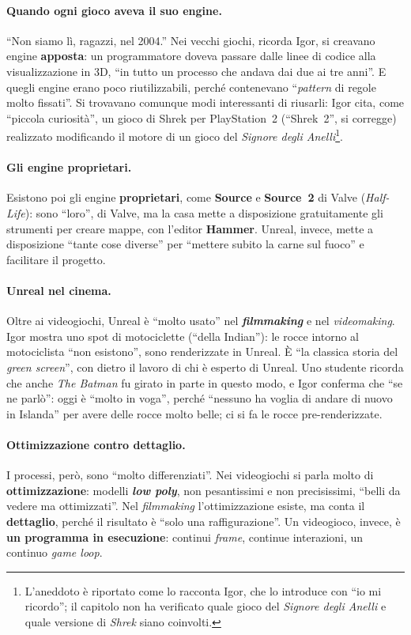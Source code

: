 \paragraph{Quando ogni gioco aveva il suo engine.} ``Non siamo lì, ragazzi, nel 2004.'' Nei
vecchi giochi, ricorda Igor, si creavano engine \textbf{apposta}: un programmatore
doveva passare dalle linee di codice alla visualizzazione in 3D, ``in tutto un processo
che andava dai due ai tre anni''. E quegli engine erano poco riutilizzabili, perché
contenevano ``\emph{pattern} di regole molto fissati''. Si trovavano comunque modi
interessanti di riusarli: Igor cita, come ``piccola curiosità'', un gioco di Shrek per
PlayStation~2 (``Shrek~2'', si corregge) realizzato modificando il motore di un gioco
del \emph{Signore degli Anelli}\footnote{L'aneddoto è riportato come lo racconta Igor,
che lo introduce con ``io mi ricordo''; il capitolo non ha verificato quale gioco del
\emph{Signore degli Anelli} e quale versione di \emph{Shrek} siano coinvolti.}.

\paragraph{Gli engine proprietari.} Esistono poi gli engine \textbf{proprietari}, come
\textbf{Source} e \textbf{Source~2} di Valve (\emph{Half-Life}): sono ``loro'', di Valve,
ma la casa mette a disposizione gratuitamente gli strumenti per creare mappe, con
l'editor \textbf{Hammer}. Unreal, invece, mette a disposizione ``tante cose diverse''
per ``mettere subito la carne sul fuoco'' e facilitare il progetto.

\paragraph{Unreal nel cinema.} Oltre ai videogiochi, Unreal è ``molto usato'' nel
\textbf{\emph{filmmaking}} e nel \emph{videomaking}. Igor mostra uno spot di
motociclette (``della Indian''): le rocce intorno al motociclista ``non esistono'', sono
renderizzate in Unreal. È ``la classica storia del \emph{green screen}'', con dietro il
lavoro di chi è esperto di Unreal. Uno studente ricorda che anche \emph{The Batman} fu
girato in parte in questo modo, e Igor conferma che ``se ne parlò'': oggi è ``molto in
voga'', perché ``nessuno ha voglia di andare di nuovo in Islanda'' per avere delle
rocce molto belle; ci si fa le rocce pre-renderizzate.

\paragraph{Ottimizzazione contro dettaglio.} I processi, però, sono ``molto
differenziati''. Nei videogiochi si parla molto di \textbf{ottimizzazione}: modelli
\textbf{\emph{low poly}}, non pesantissimi e non precisissimi, ``belli da vedere ma
ottimizzati''. Nel \emph{filmmaking} l'ottimizzazione esiste, ma conta il
\textbf{dettaglio}, perché il risultato è ``solo una raffigurazione''. Un videogioco,
invece, è \textbf{un programma in esecuzione}: continui \emph{frame}, continue
interazioni, un continuo \emph{game loop}.


